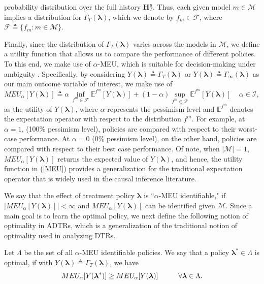 \documentclass[opre,nonblindrev]{informs2}%
\newcommand{\teq}{\triangleq}
\newcommand{\1}{\hbox{\rm 1\kern-.35em 1}}
\newcommand{\E}{\mathbb E}
\newcommand{\MI}{\mathscr I}
\newcommand{\MM}{\mathscr M}
\newcommand{\MF}{\mathscr F}
\newcommand{\blambda}{\boldsymbol{\lambda}}
\newcommand{\bH}{\mathbf{H}}
\begin{document}
probability distribution over the full history $\bH_T^u$. Thus, each given model $m\in\MM$ implies a distribution for $\Gamma_T(\blambda)$, which we denote by $f_m\in\MF$, where $\MF\teq\{f_m: m\in\MM\}$.



 Finally, since the distribution of $\Gamma_T(\blambda)$ varies across the models in $\MM$,  we define a utility function that allows us to compare the performance of different policies. To this end, we make use of  $\alpha$-MEU, which is suitable for decision-making under ambiguity \citep[see, e.g.,][]{Ghiradato2004, Marinacci2002,Saghafian2018}. Specifically, by considering $Y(\blambda)\teq\Gamma_T(\blambda)$ or $Y(\blambda)\teq\Gamma_\infty(\blambda)$ as our main outcome variable of interest, we make use of
\begin{equation}\label{MEU}
MEU_\alpha [Y (\blambda)] \teq \alpha\,\inf_{f^m\in\MF} \E^{f^m} [Y (\blambda)]+ (1-\alpha) \sup_{f^m\in\MF} \E^{f^m} [Y (\blambda)]\ \ \ \ \ \alpha\in\MI,
\end{equation}
as the utility of $Y(\blambda)$, where  $\alpha$ represents the pessimism level and $\E^{f^m}$ denotes the expectation operator with respect to the distribution $f^m$. For example, at $\alpha=1$, (100\% pessimism level),   policies are compared with respect to their worst-case performance. At  $\alpha=0$ (0\% pessimism level), on the other hand, policies are compared with respect to their best case performance. Of note, when $|\MM|=1$, $MEU_\alpha [Y (\blambda)]$ returns the expected value of $Y (\blambda)$, and hence, the utility function in (\ref{MEU}) provides a generalization for the traditional expectation operator that is widely used in the causal inference literature.

We say that the effect of treatment policy $\blambda$ is ``$\alpha$-MEU identifiable," if $\big|MEU_\alpha [Y (\blambda)]\big|<\infty$ and  $MEU_\alpha [Y (\blambda)]$ can be identified given $\MM$. Since a main goal is to learn the  optimal policy, we next define the following notion of optimality in ADTRs, which is a generalization of the traditional notion of optimality used in analyzing DTRs.
\begin{definition} \label{def:opt}
Let $\Lambda$ be the set of all $\alpha$-MEU identifiable policies. We say that a policy ${\blambda}^*\in\Lambda$ is optimal, if with $Y(\blambda)\teq\Gamma_T(\blambda)$, we have
\begin{equation}\label{opttreatment}
MEU_\alpha [Y (\blambda^*)]\geq MEU_\alpha [Y (\blambda)]\hspace{10mm} \forall\blambda\in\Lambda.
\end{equation}
\end{definition}
\end{document}
